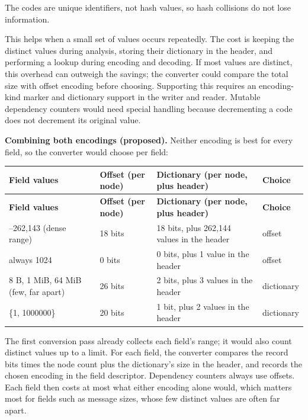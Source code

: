 \documentclass[10pt,a4paper]{article}
\begin{document}
 The codes are unique identifiers, not hash values, so hash collisions do not lose information.

This helps when a small set of values occurs repeatedly. The cost is keeping the distinct values during analysis, storing their dictionary in the header, and performing a lookup during encoding and decoding. If most values are distinct, this overhead can outweigh the savings; the converter could compare the total size with offset encoding before choosing. Supporting this requires an encoding-kind marker and dictionary support in the writer and reader. Mutable dependency counters would need special handling because decrementing a code does not decrement its original value.

\textbf{Combining both encodings (proposed).} Neither encoding is best for every field, so the converter would choose per field:

{\small
\begin{longtable}{P{0.28\dimexpr{}\tabcolsep\relax}P{0.16\dimexpr{}\tabcolsep\relax}P{0.36\dimexpr{}\tabcolsep\relax}P{0.2\dimexpr{}\tabcolsep\relax}}
\toprule
\textbf{Field values} & \textbf{Offset (per node)} & \textbf{Dictionary (per node, plus header)} & \textbf{Choice} \\
\midrule
\endfirsthead
\toprule
\textbf{Field values} & \textbf{Offset (per node)} & \textbf{Dictionary (per node, plus header)} & \textbf{Choice} \\
\midrule
\endhead
\bottomrule
{}--262,143 (dense range) & 18 bits & 18 bits, plus 262,144 values in the header & offset \\
always 1024 & 0 bits & 0 bits, plus 1 value in the header & offset \\
8 B, 1 MiB, 64 MiB (few, far apart) & 26 bits & 2 bits, plus 3 values in the header & dictionary \\
\{1, 1000000\} & 20 bits & 1 bit, plus 2 values in the header & dictionary \\
\end{longtable}
}

The first conversion pass already collects each field's range; it would also count distinct values up to a limit. For each field, the converter compares the record bits times the node count plus the dictionary's size in the header, and records the chosen encoding in the field descriptor. Dependency counters always use offsets. Each field then costs at most what either encoding alone would, which matters most for fields such as message sizes, whose few distinct values are often far apart.
\end{document}
